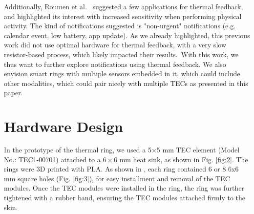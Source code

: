 \documentclass[preprint,12pt]{elsarticle}
\begin{document}
Additionally, Roumen et al.~\cite{24} suggested a few applications for thermal feedback, and highlighted its interest with increased sensitivity when performing physical activity.
The kind of notifications suggested is "non-urgent" notifications (e.g. calendar event, low battery, app update).
As we already highlighted, this previous work did not use optimal hardware for thermal feedback, with a very slow resistor-based process, which likely impacted their results.\
With this work, we thus want to further explore notifications using thermal feedback.
We also envision smart rings with multiple sensors embedded in it, which could include other modalities, which could pair nicely with multiple TECs as presented in this paper.

\section{Hardware Design}


In the prototype of the thermal ring, we used a 5×5 mm TEC element (Model No.: TEC1-00701) attached to a $6 \times 6$ mm heat sink, as shown in Fig. \ref{fig:2}.  The rings were 3D printed with PLA. As shown in , each ring contained 6 or 8 6x6 mm square holes (Fig. \ref{fig:3}), for easy installment and removal of the TEC modules. Once the TEC modules were installed in the ring, the ring was further tightened with a rubber band, ensuring the TEC modules attached firmly to the skin.
\end{document}

